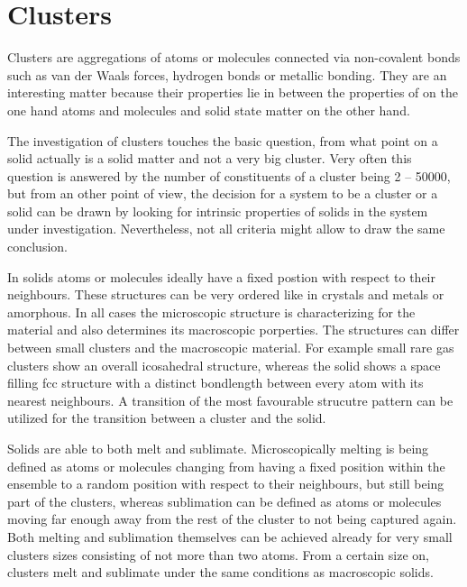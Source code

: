 \section{Clusters}

Clusters are aggregations of atoms or molecules connected via non-covalent
bonds such as van der Waals forces, hydrogen bonds or metallic bonding.
They are an interesting
matter because their properties lie in between the properties of on the one hand
atoms and molecules and solid state matter on the other hand.

The investigation of clusters touches the basic question, from what point
on a solid actually is a solid matter and not a very big cluster.
Very often this question is answered by the number of constituents
of a cluster being
2 -- 50000, but from an other point of view, the decision for
a system to be a cluster or a solid can be drawn by looking for
intrinsic 
properties of solids in the system under investigation.
Nevertheless, not all criteria might allow to draw the same conclusion.

In solids atoms or molecules ideally have a fixed postion with respect to their
neighbours. These structures can be very ordered like in crystals and metals
or amorphous. In all cases the microscopic structure is characterizing for
the material and also determines its macroscopic
porperties.
The structures can differ between small clusters and the macroscopic
material. For example small rare gas clusters show an overall icosahedral
structure, whereas the solid shows a space filling fcc structure with
a distinct bondlength between every atom with its nearest neighbours.
A transition of the most favourable strucutre pattern can be utilized
for the transition between a cluster and the solid.

Solids are able to both melt and sublimate. Microscopically melting
is being defined as atoms or
molecules changing from having a fixed position within the ensemble to a
random position with respect to their neighbours, but still being part
of the clusters, whereas sublimation can be defined as atoms or molecules
moving far enough away from the rest of the cluster to not being captured
again.
Both melting and sublimation themselves can be achieved already for very
small clusters
sizes consisting of not more than two atoms. From a certain size on,
clusters melt and sublimate under the same conditions as macroscopic
solids.


